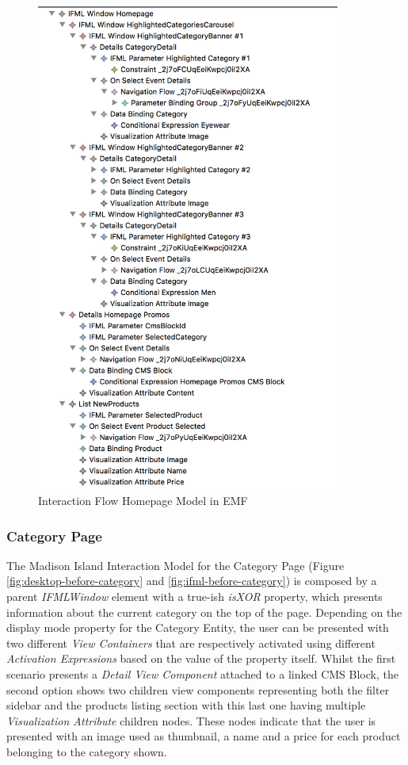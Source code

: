 \vspace{0.5cm}
\begin{figure}[H]
  \centering
    \includegraphics[width=10cm]{images/diagrams/before/ifml-hierarchy-homepage.png}
  \caption{Interaction Flow Homepage Model in EMF}
  \label{fig:ifml-before-hierarchy-homepage}
\end{figure}
\vspace{0.5cm}

\newpage
\subsubsection{Category Page}

The Madison Island Interaction Model for the Category Page (Figure \ref{fig:desktop-before-category} and \ref{fig:ifml-before-category}) is composed by a parent \textit{IFMLWindow} element with a true-ish \textit{isXOR} property, which presents information about the current category on the top of the page. Depending on the display mode property for the Category Entity, the user can be presented with two different \textit{View Containers} that are respectively activated using different \textit{Activation Expressions} based on the value of the property itself. Whilst the first scenario presents a \textit{Detail View Component} attached to a linked CMS Block, the second option shows two children view components representing both the filter sidebar and the products listing section with this last one having multiple \textit{Visualization Attribute} children nodes. These nodes indicate that the user is presented with an image used as thumbnail, a name and a price for each product belonging to the category shown.

